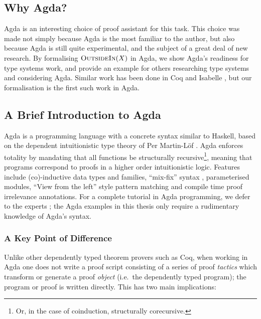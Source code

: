 \documentclass[a4paper]{jfp}
\newcommand{\outsidein}{\textsc{OutsideIn}(X)}
\begin{document}
\subsection{Why Agda?}

Agda is an interesting choice of proof assistant for this task. This choice was made not simply because Agda is the most familiar to the author, but
also because Agda is still quite experimental, and the subject of a great deal of new research. By formalising $\outsidein$ in Agda, we show Agda's
readiness for type systems work, and provide an example for others researching type systems and considering Agda. Similar work has been done in Coq
\cite{Dubois99certificationof} and Isabelle \cite{Naraschewski:1999:TIV:594135.594270}, but our formalisation is the first such work in Agda. 

\subsection{A Brief Introduction to Agda}
 
Agda is a programming language with a concrete syntax similar to Haskell, based on the dependent intuitionistic type theory of Per Martin-L\"of
\cite{MartinLof:1984tr}. Agda enforces totality by mandating that all functions be structurally recursive\footnote{Or, in the case of coinduction,
structurally corecursive.}, meaning that programs correspond to proofs in a higher order intuitionistic logic. Features include (co)-inductive data
types and families, ``mix-fix'' syntax \cite{springerlink:10.1007/978-3-642-24452-0_5}, parameterised modules, ``View from the left'' style pattern
matching \cite{McBride:2004:VL:967492.967496} and compile time proof irrelevance annotations. For a complete tutorial in Agda programming, we defer to
the experts \cite{conf/afp/norell08}; the Agda examples in this thesis only require a rudimentary knowledge of Agda's syntax.

\subsubsection{A Key Point of Difference}

Unlike other dependently typed theorem provers such as Coq, when working in Agda one does not write a proof script consisting of a series of proof
\emph{tactics} which transform or generate a proof \emph{object} (i.e.\ the dependently typed program); the program or proof is written directly. This
has two main implications:
\end{document}
